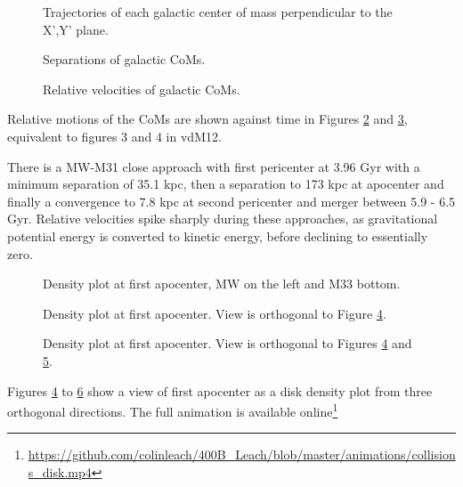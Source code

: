 \documentclass[twocolumn]{aastex63}
\begin{document}
\begin{figure}[htb!]
	\caption{Trajectories of each galactic center of mass perpendicular to the X',Y' plane.
		\label{fig:traj_z}}
\end{figure}

\begin{figure}[hbt!]
	\caption{Separations of galactic CoMs.
		\label{fig:rel_sep}}
\end{figure}

\begin{figure}[hbt!]
	\caption{Relative velocities of galactic CoMs.
		\label{fig:rel_vel}}
\end{figure}

Relative motions of the CoMs are shown against time in Figures \ref{fig:rel_sep} and \ref{fig:rel_vel}, equivalent to figures 3 and 4 in vdM12.

There is a MW-M31 close approach with first pericenter at 3.96 Gyr with a minimum separation of 35.1 kpc, then a separation to 173 kpc at apocenter and finally a convergence to 7.8 kpc at second pericenter and merger between 5.9 - 6.5 Gyr. Relative velocities spike sharply during these approaches, as gravitational potential energy is converted to kinetic energy, before declining to essentially zero.

\begin{figure}[hbt!]
	\caption{Density plot at first apocenter, MW on the left and M33 bottom.
		\label{fig:3view_first_apo_a}}
\end{figure} %

\begin{figure}[hbt!]
	\caption{Density plot at first apocenter. View is orthogonal to Figure \ref{fig:3view_first_apo_a}.
		\label{fig:3view_first_apo_b}}
\end{figure} %

\begin{figure}[hbt!]
	\caption{Density plot at first apocenter. View is orthogonal to Figures \ref{fig:3view_first_apo_a} and \ref{fig:3view_first_apo_b}.
		\label{fig:3view_first_apo_c}}
\end{figure}

Figures \ref{fig:3view_first_apo_a} to \ref{fig:3view_first_apo_c} show a view of first apocenter as a disk density plot from three orthogonal directions. The full animation is available online\footnote{\url{https://github.com/colinleach/400B_Leach/blob/master/animations/collisions_disk.mp4}}
\end{document}
